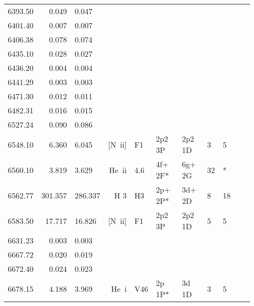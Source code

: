 \begin{longtable}{lrlrlllllll}
 6393.50 &   0.049 &   0.047                                                                                      \\
 6401.40 &   0.007 &   0.007                                                                                      \\
 6406.38 &   0.078 &   0.074                                                                                      \\
 6435.10 &   0.028 &   0.027                                                                                      \\
 6436.20 &   0.004 &   0.004                                                                                      \\
 6441.29 &   0.003 &   0.003                                                                                      \\
 6471.30 &   0.012 &   0.011                                                                                      \\
 6482.31 &   0.016 &   0.015                                                                                      \\
 6527.24 &   0.090 &   0.086                                                                                      \\
 6548.10 &   6.360 &   6.045 &  [N~{\sc ii}]    &  F1        &  2p2 3P    &  2p2 1D    &          3 &        5    \\
 6560.10 &   3.819 &   3.629 &  He~{\sc ii}     &  4.6       &  4f+ 2F*   &  6g+ 2G    &         32 &        *    \\
 6562.77 & 301.357 & 286.337 &  H 3       &  H3        &  2p+ 2P*   &  3d+ 2D    &          8 &       18          \\
 6583.50 &  17.717 &  16.826 &  [N~{\sc ii}]    &  F1        &  2p2 3P    &  2p2 1D    &          5 &        5    \\
 6631.23 &   0.003 &   0.003                                                                                      \\
 6667.72 &   0.020 &   0.019                                                                                      \\
 6672.40 &   0.024 &   0.023                                                                                      \\
 6678.15 &   4.188 &   3.969 &  He~{\sc i}      &  V46       &  2p 1P*    &  3d 1D     &          3 &        5    \\

\end{longtable}

